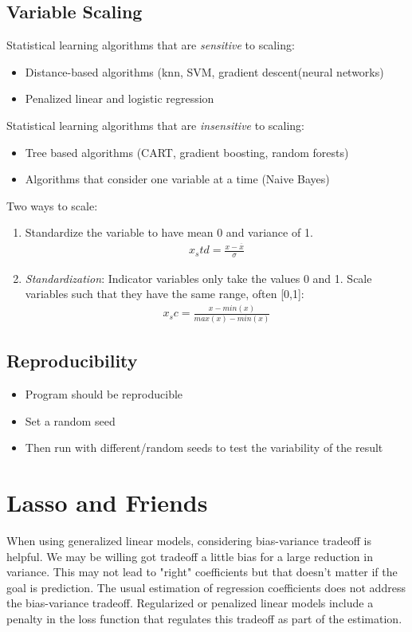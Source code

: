 \documentclass[12pt, oneside]{article}
\newcommand*{\barx}{\overline x}
\begin{document}
\subsection{Variable Scaling}
Statistical learning algorithms that are \emph{sensitive} to scaling: 
\begin{itemize}
    \item Distance-based algorithms (knn, SVM, gradient descent(neural networks)
    \item Penalized linear and logistic regression
\end{itemize}

Statistical learning algorithms that are \emph{insensitive} to scaling: 
\begin{itemize}
    \item Tree based algorithms (CART, gradient boosting, random forests)
    \item Algorithms that consider one variable at a time (Naive Bayes)
\end{itemize}


Two ways to scale:
\begin{enumerate}
    \item Standardize the variable to have mean 0 and variance of 1.
    \begin{align*}
        x_std = \frac{x - \barx}{\sigma}
    \end{align*}
    \item \emph{Standardization}: Indicator variables only take the values 0 and 1. Scale variables such that they have the same range, often [0,1]:
    \begin{align*}
        x_sc = \frac{x - min(x)}{max(x)-min(x)}
    \end{align*}
\end{enumerate}

\subsection{Reproducibility}
\begin{itemize}
    \item Program should be reproducible
    \item Set a random seed
    \item Then run with different/random seeds to test the variability of the result 
\end{itemize}


\section{Lasso and Friends}
When using generalized linear models, considering bias-variance tradeoff is helpful. We may be willing got tradeoff a little bias for a large reduction in variance. This may not lead to "right" coefficients but that doesn't matter if the goal is prediction. The usual estimation of regression coefficients does not address the bias-variance tradeoff. Regularized or penalized linear models include a penalty in the loss function that regulates this tradeoff as part of
the estimation.
\end{document}
